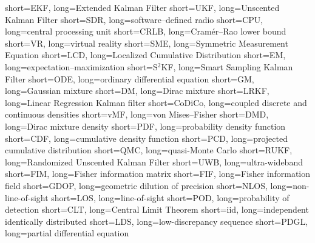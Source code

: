 		{short={EKF},	    	    long={Extended Kalman Filter}}
		{short={UKF},	    	    long={Unscented Kalman Filter}}
		{short={SDR},	    	    long={software--defined radio}}
		{short={CPU},	    	    long={central processing unit}}
		{short={CRLB},	    	  long={Cramér--Rao lower bound}}
		  {short={VR},	    	    long={virtual reality}}
		{short={SME},	    	    long={Symmetric Measurement Equation}}
		{short={LCD},	    	    long={Localized Cumulative Distribution}}
	    {short={EM},	    	    long={expectation--maximization}}
	  {short={S$^2$KF},	      long={Smart Sampling Kalman Filter}}
	  {short={ODE},	    	    long={ordinary differential equation}}
	    {short={GM},	    	    long={Gaussian mixture}}
	    {short={DM},	    	    long={Dirac mixture}}
	  {short={LRKF},	    	  long={Linear Regression Kalman filter}}
	{short={CoDiCo},	      long={coupled discrete and continuous densities}} 
		{short={vMF},	    	    long={von Mises--Fisher}}
		{short={DMD},	    	    long={Dirac mixture density}}
		{short={PDF},	    	    long={probability density function}}
		{short={CDF},	    	    long={cumulative density function}}
		{short={PCD},	    	    long={projected cumulative distribution}}
		{short={QMC},	    	    long={quasi-Monte Carlo}}
		{short={RUKF},	    	  long={Randomized Unscented Kalman Filter}}
		{short={UWB},	    	    long={ultra-wideband}}
		{short={FIM},	    	    long={Fisher information matrix}}
		{short={FIF},	    	    long={Fisher information field}}
		{short={GDOP},	    	  long={geometric dilution of precision}}
		{short={NLOS},	    	  long={non-line-of-sight}}
		{short={LOS},	    	    long={line-of-sight}}
		{short={POD},	    	    long={probability of detection}}
		{short={CLT},	    	    long={Central Limit Theorem}}
		{short={iid},	    	long={independent identically distributed}}
		{short={LDS},	    	long={low-discrepancy sequence}}
		{short={PDGL},	    	long={partial differential equation}}



